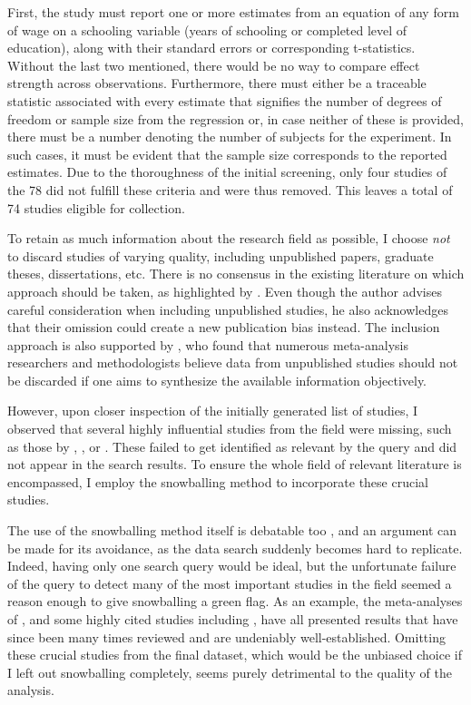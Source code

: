First, the study must report one or more estimates from an equation of any form of wage on a schooling variable (years of schooling or completed level of education), along with their standard errors or corresponding t-statistics. Without the last two mentioned, there would be no way to compare effect strength across observations. Furthermore, there must either be a traceable statistic associated with every estimate that signifies the number of degrees of freedom or sample size from the regression or, in case neither of these is provided, there must be a number denoting the number of subjects for the experiment. In such cases, it must be evident that the sample size corresponds to the reported estimates. Due to the thoroughness of the initial screening, only four studies of the 78 did not fulfill these criteria and were thus removed. This leaves a total of 74 studies eligible for collection.

To retain as much information about the research field as possible, I choose \textit{not} to discard studies of varying quality, including unpublished papers, graduate theses, dissertations, etc. There is no consensus in the existing literature on which approach should be taken, as highlighted by \cite{stanley2001wheat}. Even though the author advises careful consideration when including unpublished studies, he also acknowledges that their omission could create a new publication bias instead. The inclusion approach is also supported by \cite{cook1993should}, who found that numerous meta-analysis researchers and methodologists believe data from unpublished studies should not be discarded if one aims to synthesize the available information objectively.

However, upon closer inspection of the initially generated list of studies, I observed that several highly influential studies from the field were missing, such as those by  \cite{angrist1991compulsory}, \cite{staiger1997instrumental}, or \cite{heckman2006earnings}. These failed to get identified as relevant by the query and did not appear in the search results. To ensure the whole field of relevant literature is encompassed, I employ the snowballing method to incorporate these crucial studies.

The use of the snowballing method itself is debatable too , and an argument can be made for its avoidance, as the data search suddenly becomes hard to replicate. Indeed, having only one search query would be ideal, but the unfortunate failure of the query to detect many of the most important studies in the field seemed a reason enough to give snowballing a green flag. As an example, the meta-analyses of \citep{psacharopoulos1994meta, fleisher2005meta, psacharopoulos2018meta}, and some highly cited studies including \citep{card1995using, heckman2006earnings, psacharopoulos2018meta}, have all presented results that have since been many times reviewed and are undeniably well-established. Omitting these crucial studies from the final dataset, which would be the unbiased choice if I left out snowballing completely, seems purely detrimental to the quality of the analysis.

